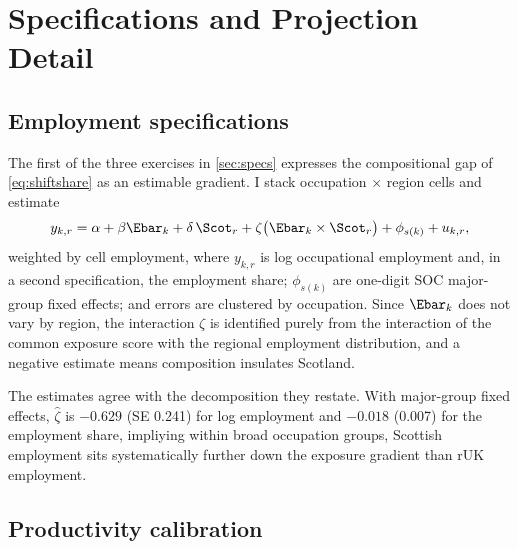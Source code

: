 \section{Specifications and Projection Detail}\label{app:specifications}

\subsection{Employment specifications}

The first of the three exercises in \cref{sec:specs} expresses the compositional gap of \cref{eq:shiftshare} as an estimable gradient. I stack occupation $\times$ region cells and estimate
\begin{equation}\label{eq:employment}
y_{k,r} = \alpha + \beta \Ebar_k + \delta\, \Scot_r +
\zeta \bigl( \Ebar_k \times \Scot_r \bigr) + \phi_{s(k)} + u_{k,r},
\end{equation}
weighted by cell employment, where $y_{k,r}$ is log occupational employment and, in a second specification, the employment share; $\phi_{s(k)}$ are one-digit SOC major-group fixed effects; and errors are clustered by occupation. Since $\Ebar_k$ does not vary by region, the interaction $\zeta$ is identified purely from the interaction of the common exposure score with the regional employment distribution, and a negative estimate means composition insulates Scotland.

The estimates agree with the decomposition they restate. With major-group fixed effects, $\widehat{\zeta}$ is $-0.629$ (SE 0.241) for log employment and $-0.018$ (0.007) for the employment share, impliying within broad occupation groups, Scottish employment sits systematically further down the exposure gradient than rUK employment. 

\subsection{Productivity calibration}

